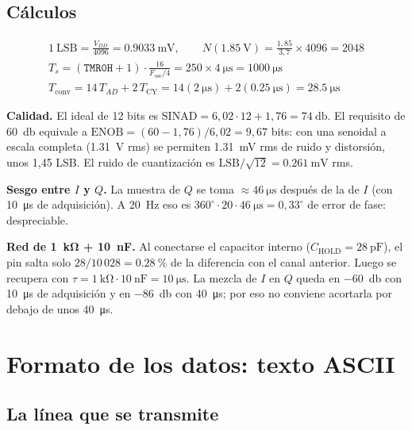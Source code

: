 \documentclass[11pt,letterpaper]{article}
\begin{document}
\subsection{Cálculos}
\begin{gather}
  1\ \text{LSB} = \frac{V_{DD}}{4096} = \SI{0.9033}{\milli\volt}, \qquad
  N(\SI{1.85}{\volt}) = \frac{1{,}85}{3{,}7}\times 4096 = 2048 \\[2pt]
  T_s = (\texttt{TMR0H} + 1)\cdot \frac{16}{F_\text{osc}/4} = 250 \times \SI{4}{\micro\second} = \SI{1000}{\micro\second} \\[2pt]
  T_\text{conv} = 14\,T_{AD} + 2\,T_\text{CY} = 14(\SI{2}{\micro\second}) + 2(\SI{0.25}{\micro\second}) = \SI{28.5}{\micro\second}
\end{gather}

\textbf{Calidad.} El ideal de 12 bits es $\text{SINAD} = 6{,}02\cdot 12 + 1{,}76 = \SI{74}{\decibel}$. El requisito de \SI{60}{\decibel} equivale a $\text{ENOB} = (60-1{,}76)/6{,}02 = 9{,}67$ bits: con una senoidal a escala completa (\SI{1.31}{\volt} rms) se permiten \SI{1.31}{\milli\volt} rms de ruido y distorsión, unos 1,45 LSB. El ruido de cuantización es $\text{LSB}/\sqrt{12} = \SI{0.261}{\milli\volt}$ rms.

\textbf{Sesgo entre $I$ y $Q$.} La muestra de $Q$ se toma $\approx \SI{46}{\micro\second}$ después de la de $I$ (con \SI{10}{\micro\second} de adquisición). A \SI{20}{\hertz} eso es $360^\circ \cdot 20 \cdot \SI{46}{\micro\second} = 0{,}33^\circ$ de error de fase: despreciable.

\textbf{Red de \SI{1}{\kilo\ohm} + \SI{10}{\nano\farad}.} Al conectarse el capacitor interno ($C_\text{HOLD} = \SI{28}{\pico\farad}$), el pin salta solo $28/10\,028 = \SI{0.28}{\percent}$ de la diferencia con el canal anterior. Luego se recupera con $\tau = \SI{1}{\kilo\ohm}\cdot\SI{10}{\nano\farad} = \SI{10}{\micro\second}$. La mezcla de $I$ en $Q$ queda en \SI{-60}{\decibel} con \SI{10}{\micro\second} de adquisición y en \SI{-86}{\decibel} con \SI{40}{\micro\second}; por eso no conviene acortarla por debajo de unos \SI{40}{\micro\second}.

\section{Formato de los datos: texto ASCII}
\label{sec:formato}

\subsection{La línea que se transmite}
\end{document}
